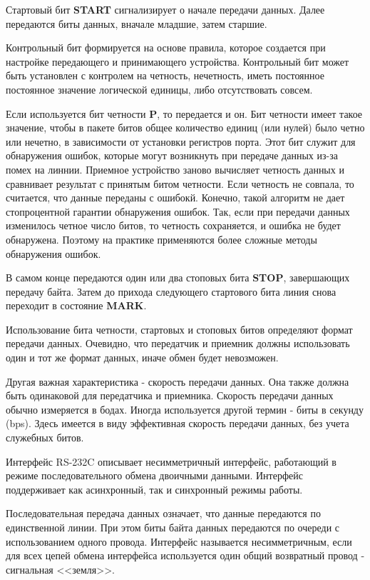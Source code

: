 \documentclass[russian,utf8,simple,emptystyle]{eskdtext}
\begin{document}
Стартовый бит \textbf{START} сигнализирует о начале передачи данных. Далее передаются биты данных, вначале младшие, затем старшие.

Контрольный бит формируется на основе правила, которое создается при настройке передающего и принимающего устройства. Контрольный бит может быть установлен с контролем на четность, нечетность, иметь постоянное постоянное значение логической единицы, либо отсутствовать совсем.

Если используется бит четности \textbf{P}, то передается и он. Бит четности имеет такое значение, чтобы в пакете битов общее количество единиц  (или нулей) было четно или нечетно, в зависимости от установки регистров порта. Этот бит служит для обнаружения ошибок, которые могут возникнуть при передаче данных из-за помех на линнии. Приемное устройство заново вычисляет четность данных и сравнивает результат с принятым битом четности. Если четность не совпала, то считается, что данные переданы с ошибокй. Конечно, такой алгоритм не дает стопроцентной гарантии обнаружения ошибок. Так, если при передачи данных изменилось четное число битов, то четность сохраняется, и ошибка не будет обнаружена. Поэтому на практике применяются более сложные методы обнаружения ошибок.

В самом конце передаются один или два стоповых бита \textbf{STOP}, завершающих передачу байта. Затем до прихода следующего стартового бита линия снова переходит в состояние \textbf{MARK}.

Использование бита четности, стартовых и стоповых битов определяют формат передачи данных. Очевидно, что передатчик и приемник должны использовать один и тот же формат данных, иначе обмен будет невозможен.

Другая важная характеристика - скорость передачи данных. Она также должна быть одинаковой для передатчика и приемника. Скорость передачи данных обычно измеряется в бодах. Иногда используется другой термин - биты в секунду (bps). Здесь имеется в виду эффективная скорость передачи данных, без учета служебных битов.

Интерфейс RS-232C описывает несимметричный интерфейс, работающий в режиме последовательного обмена двоичными данными. Интерфейс поддерживает как асинхронный, так и синхронный режимы работы.

Последовательная передача данных означает, что данные передаются по единственной линии. При этом биты байта данных передаются по очереди с использованием одного провода. Интерфейс называется несимметричным, если для всех цепей обмена интерфейса используется один общий возвратный провод - сигнальная <<земля>>.
\end{document}
